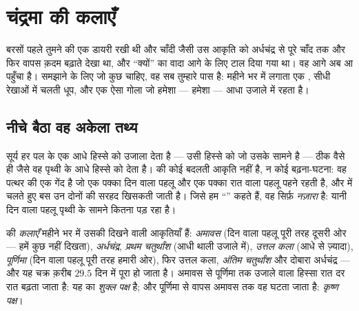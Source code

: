 \chapter{चंद्रमा की कलाएँ}\label{ch:g7:moon-phases}

बरसों पहले तुमने  की एक डायरी रखी थी और चाँदी जैसी उस आकृति को
अर्धचंद्र से पूरे चाँद तक और फिर वापस क़दम बढ़ाते देखा था, और ``क्यों''
का वादा आगे के लिए टाल दिया गया था। वह आगे अब आ पहुँचा है। समझाने के
लिए जो कुछ चाहिए, वह सब तुम्हारे पास है: महीने भर में  लगाता एक
, सीधी रेखाओं में चलती धूप, और एक ऐसा गोला जो हमेशा --- हमेशा
--- आधा उजाले में रहता है।

\section{नीचे बैठा वह अकेला तथ्य}

\begin{proposition}[हमेशा आधा उजाले में]\label{prop:g7:moon-phases:halflit}
सूर्य हर पल  के एक आधे हिस्से को उजाला देता है --- उसी हिस्से
को जो उसके सामने है --- ठीक वैसे ही जैसे वह पृथ्वी के आधे हिस्से को
देता है।  की कोई बदलती आकृति नहीं है, न कोई बढ़ना-घटना: वह
पत्थर की एक गेंद है जो एक पक्का दिन वाला पहलू और एक पक्का रात वाला
पहलू पहने रहती है, और  में चलते हुए बस उन दोनों की सरहद खिसकती
जाती है। जिसे हम ``'' कहते हैं, वह सिर्फ़ \emph{नज़ारा} है: यानी
दिन वाला पहलू पृथ्वी के सामने कितना पड़ रहा है।
\end{proposition}

\begin{definition}[कलाएँ]\label{def:g7:moon-phases:phases}
 की \emph{कलाएँ} महीने भर में उसकी दिखने वाली
आकृतियाँ हैं: \emph{अमावस} (दिन वाला पहलू पूरी तरह दूसरी ओर --- हमें
कुछ नहीं दिखता), \emph{अर्धचंद्र}, \emph{प्रथम चतुर्थांश} (आधी थाली
उजाले में), \emph{उत्तल कला} (आधे से ज़्यादा), \emph{पूर्णिमा} (दिन
वाला पहलू पूरी तरह हमारी ओर), फिर उत्तल कला, \emph{अंतिम चतुर्थांश}
और दोबारा अर्धचंद्र --- और यह चक्र क़रीब $29.5$ दिन में पूरा हो जाता
है। अमावस से पूर्णिमा तक उजाले वाला हिस्सा रात दर रात बढ़ता जाता है:
यह  का \emph{शुक्ल पक्ष} है; और पूर्णिमा से
वापस अमावस तक वह घटता जाता है: \emph{कृष्ण पक्ष}।
\end{definition}

